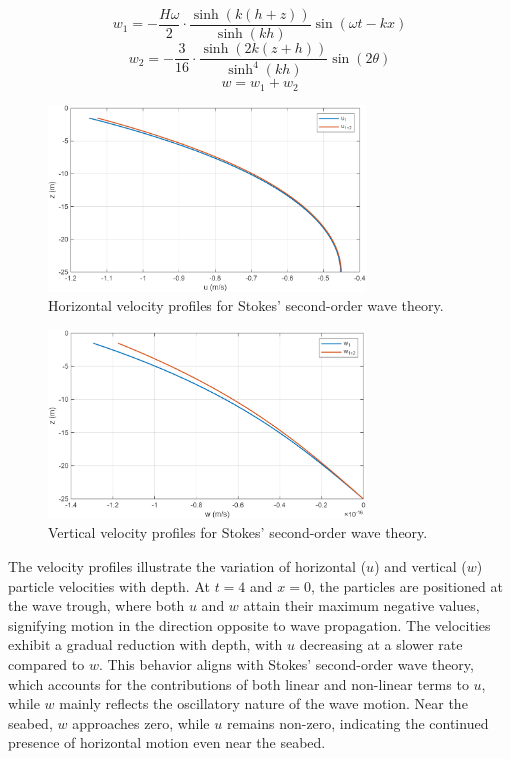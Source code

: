 \documentclass[a4paper]{article}
\begin{document}
\[w_1 = -\frac{H \omega}{2} \cdot \frac{\sinh(k(h+z))}{\sinh(kh)} \sin(\omega t - kx)\]
\[w_2 = -\frac{3}{16} \cdot \frac{\sinh(2k(z+h))}{\sinh^4(kh)} \sin(2\theta)\]
\[w = w_1 + w_2\]

\begin{figure}[H]
    \centering
    \includegraphics[width=0.75\textwidth]{CE591HW1-Q1b.png}
    \caption{\small Horizontal velocity profiles for Stokes' second-order wave theory.}
    \label{fig:plot2b}
\end{figure}


\begin{figure}[H]
    \centering
    \includegraphics[width=0.75\textwidth]{CE591HW1-Q1b_2.png}
    \caption{\small Vertical velocity profiles for Stokes' second-order wave theory.}
    \label{fig:plot2.2b}
\end{figure}
\vspace{0.3cm}

The velocity profiles illustrate the variation of horizontal (\(u\)) and vertical (\(w\)) particle velocities with depth. At \(t = 4\) and \(x = 0\), the particles are positioned at the wave trough, where both \(u\) and \(w\) attain their maximum negative values, signifying motion in the direction opposite to wave propagation. The velocities exhibit a gradual reduction with depth, with \(u\) decreasing at a slower rate compared to \(w\). This behavior aligns with Stokes' second-order wave theory, which accounts for the contributions of both linear and non-linear terms to \(u\), while \(w\) mainly reflects the oscillatory nature of the wave motion. Near the seabed, \(w\) approaches zero, while \(u\) remains non-zero, indicating the continued presence of horizontal motion even near the seabed.
\vspace{0.3cm}
\end{document}
